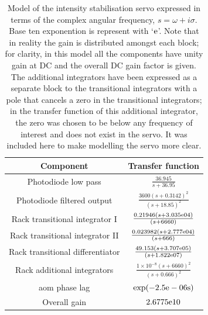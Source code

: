 \begin{table}
	\centering
	\begin{tabular}{| c | c |}
		\hline
		Component & Transfer function\\
		\hline
		Photodiode low pass & $\frac{36.945}{s+36.95}$  \\
		Photodiode filtered output &$\frac{3600 (s+0.3142)^2}{(s+18.85)^2} $ \\
		Rack transitional integrator I &  $\frac{0.21946 (s+3.035\rm{e}04)}{(s+6660)}$ \\
		Rack transitional integrator II & $\frac{0.023982 (s+2.777\rm{e}04)}{(s+666)} $ \\
		Rack transitional differentiator & $\frac{49.153 (s+3.707\rm{e}05)}{(s+1.822\rm{e}07)}$\\
		Rack additional integrators & $ \frac{1\times10^{-8} (s+6660)^2}{(s+0.666)^2}$ \\
		\gls{aom} phase lag & $\exp(-2.5\rm{e}-06s)$ \\
		Overall gain & $2.6775\rm{e}10$ \\
		\hline 
	\end{tabular}
\caption[Transfer function for each part of the intensity stabilisation servo.]{Model of the intensity stabilisation servo expressed in terms of the complex angular frequency, $s = \omega + i\sigma$. Base ten exponention is represent with `$\rm{e}$'. Note that in reality the gain is distributed amongst each block; for clarity, in this model all the components have unity gain at DC and the overall DC gain factor is given. The additional integrators have been expressed as a separate block to the transitional integrators with a pole that cancels a zero in the transitional integrators; in the transfer function of this additional integrator, the zero was chosen to be below any frequency of interest and does not exist in the servo. It was included here to make modelling the servo more clear. }
\label{tab:ligolaserchapterservomodel}
\end{table}

